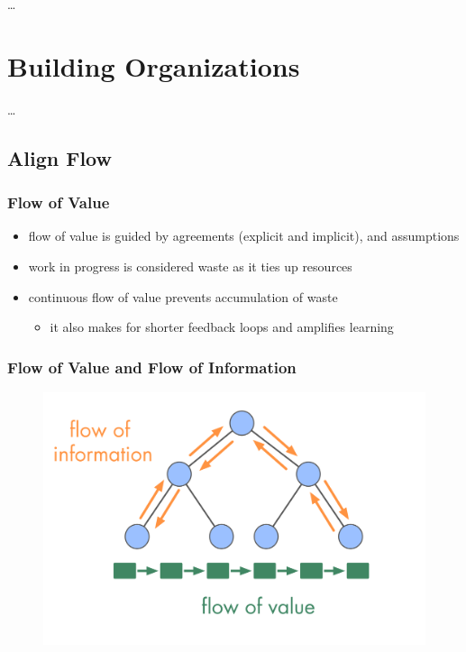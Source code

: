 {\ldots}

\chapter{Building Organizations}
\label{buildingorganizations}

{\ldots}

\section{Align Flow}
\label{alignflow}

\subsection{Flow of Value}
\label{flowofvalue}

\begin{itemize}
\item flow of value is guided by agreements (explicit and implicit), and assumptions

\item work in progress is considered waste as it ties up resources

\item continuous flow of value prevents accumulation of waste

\begin{itemize}
\item it also makes for shorter feedback loops and amplifies learning

\end{itemize}

\end{itemize}

\subsection{Flow of Value and Flow of Information}
\label{flowofvalueandflowofinformation}

\begin{figure}[htbp]
\centering
\includegraphics[keepaspectratio,width=\textwidth,height=0.75\textheight]{img/evolution/types-of-flow.png}
\end{figure}

